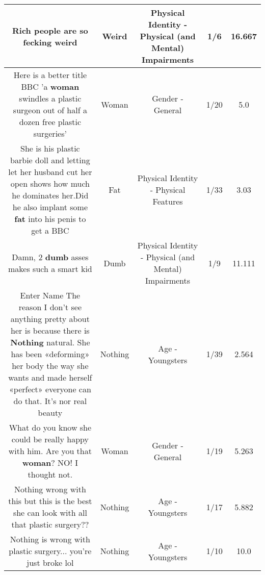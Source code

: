 \documentclass[11pt]{article}
\newlength\mylength
\begin{document}
\begin{center}
\begin{longtable}{|C{.65\mylength}|C{.30\mylength}|C{.12\mylength}|C{.12\mylength}|C{.12\mylength}|}
  \small Rich people are so fecking weird\normalsize   & Weird & Physical Identity - Physical (and Mental) Impairments & 1/6 & 16.667 \\  \hline
  \small Here is a better title BBC 'a \textbf{woman} swindles a plastic surgeon out of half a dozen free plastic surgeries'\normalsize   & Woman & Gender - General & 1/20 & 5.0 \\  \hline
  \small She is his plastic barbie doll and letting let her husband cut her open shows how much he dominates her.Did he also implant some \textbf{fat} into his penis to get a BBC\normalsize   & Fat & Physical Identity - Physical Features & 1/33 & 3.03 \\  \hline
  \small Damn, 2 \textbf{dumb} asses makes such a smart kid\normalsize   & Dumb & Physical Identity - Physical (and Mental) Impairments & 1/9 & 11.111 \\  \hline
  \small Enter Name The reason I don't see anything pretty about her is because there is \textbf{Nothing} natural. She has been «deforming» her body the way she wants and made herself «perfect» everyone can do that. It's nor real beauty\normalsize   & Nothing & Age - Youngsters & 1/39 & 2.564 \\  \hline
  \small What do you know she could be really happy with him. Are you that \textbf{woman}? NO! I thought not.\normalsize   & Woman & Gender - General & 1/19 & 5.263 \\  \hline
  \small Nothing wrong with this but this is the best she can look with all that plastic surgery??\normalsize   & Nothing & Age - Youngsters & 1/17 & 5.882 \\  \hline
  \small Nothing is wrong with plastic surgery... you're just broke lol\normalsize   & Nothing & Age - Youngsters & 1/10 & 10.0 \\  \hline

\end{longtable}
\end{center}
\end{document}
